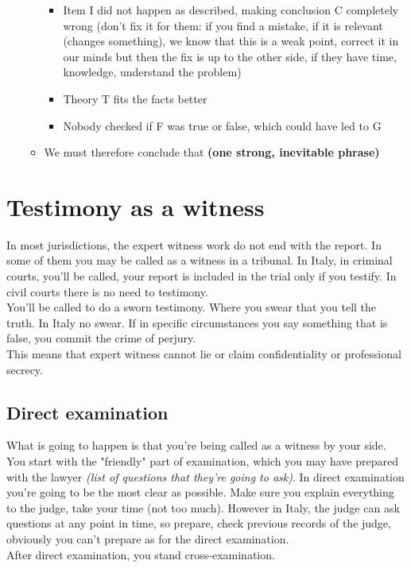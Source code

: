 \begin{itemize}
\begin{itemize}
\begin{itemize}
                        \item Item I did not happen as described, making conclusion C completely wrong (don't fix it for them: if you find a mistake, if it is relevant (changes something), we know that this is a weak point, correct it in our minds but then the fix is up to the other side, if they have time, knowledge, understand the problem)
                        \item Theory T fits the facts better 
                        \item Nobody checked if F was true or false, which could have led to G
                    \end{itemize}
                    \item We must therefore conclude that \textbf{(one strong, inevitable phrase)}
                \end{itemize}
            \end{itemize}
    \section{Testimony as a witness}
        In most jurisdictions, the expert witness work do not end with the report. In some of them you may be called as a witness in a tribunal. In Italy, in criminal courts, you'll be called, your report is included in the trial only if you testify. In civil courts there is no need to testimony.\\
        You'll be called to do a sworn testimony. Where you swear that you tell the truth. In Italy no swear. If in specific circumstances you say something that is false, you commit the crime of perjury.\\
        This means that expert witness cannot lie or claim confidentiality or professional secrecy.
        \subsection{Direct examination}
            What is going to happen is that you're being called as a witness by your side.\\
            You start with the "friendly" part of examination, which you may have prepared with the lawyer \textit{(list of questions that they're going to ask)}. In direct examination you're going to be the most clear as possible. Make sure you explain everything to the judge, take your time (not too much). However in Italy, the judge can ask questions at any point in time, so prepare, check previous records of the judge, obviously you can't prepare as for the direct examination.\\
            After direct examination, you stand cross-examination.
